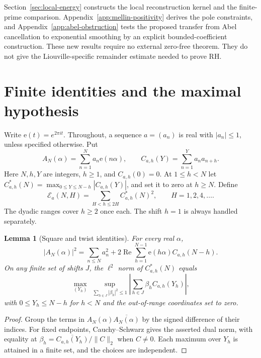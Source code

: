 \documentclass[11pt]{amsart}
\newtheorem{lemma}[theorem]{Lemma}
\theoremstyle{definition}
\theoremstyle{remark}
\newcommand{\E}{\mathcal E}
\newcommand{\ee}{\mathrm e}
\numberwithin{equation}{section}
\begin{document}
Section~\ref{sec:local-energy} constructs the local reconstruction kernel and the finite-prime comparison. Appendix~\ref{app:mellin-positivity} derives the pole constraints, and Appendix~\ref{app:abel-obstruction} tests the proposed transfer from Abel cancellation to exponential smoothing by an explicit bounded-coefficient construction. These new results require no external zero-free theorem. They do not give the Liouville-specific remainder estimate needed to prove RH.

\section{Finite identities and the maximal hypothesis}\label{sec:collar}

Write \(\ee(t)=e^{2\pi i t}\). Throughout, a sequence \(a=(a_n)\) is real with \(|a_n|\le1\), unless specified otherwise. Put
\[
 A_N(\alpha)=\sum_{n=1}^N a_n\ee(n\alpha),\qquad
 C_{a,h}(Y)=\sum_{n=1}^{Y}a_na_{n+h}.
\]
Here \(N,h,Y\) are integers, \(h\ge1\), and \(C_{a,h}(0)=0\). At \(1\le h<N\) let \(C^*_{a,h}(N)=\max_{0\le Y\le N-h}|C_{a,h}(Y)|\), and set it to zero at \(h\ge N\). Define
\[
 \E_a(N,H)=\sum_{H<h\le2H} C^*_{a,h}(N)^2,\qquad H=1,2,4,\ldots .
\]
The dyadic ranges cover \(h\ge2\) once each. The shift \(h=1\) is always handled separately.

\begin{lemma}[Square and twist identities]\label{lem:square}
For every real \(\alpha\),
\begin{equation}\label{eq:square}
 |A_N(\alpha)|^2=\sum_{n\le N}a_n^2+
 2\operatorname{Re}\sum_{h=1}^{N-1}\ee(h\alpha) C_{a,h}(N-h).
\end{equation}
On any finite set of shifts \(J\), the \(\ell^2\) norm of \(C^*_{a,h}(N)\) equals
\[
 \max_{(Y_h)}\ \sup_{\sum_{h\in J}|\beta_h|^2\le1}
 \left|\sum_{h\in J}\beta_h C_{a,h}(Y_h)\right|,
\]
with \(0\le Y_h\le N-h\) for \(h<N\) and the out-of-range coordinates set to zero.
\end{lemma}
\begin{proof}
Group the terms in \(A_N(\alpha)\overline{A_N(\alpha)}\) by the signed difference of their indices. For fixed endpoints, Cauchy--Schwarz gives the asserted dual norm, with equality at \(\beta_h=\overline{C_{a,h}(Y_h)}/\|C\|_2\) when \(C\ne0\). Each maximum over \(Y_h\) is attained in a finite set, and the choices are independent.
\end{proof}


\end{document}
